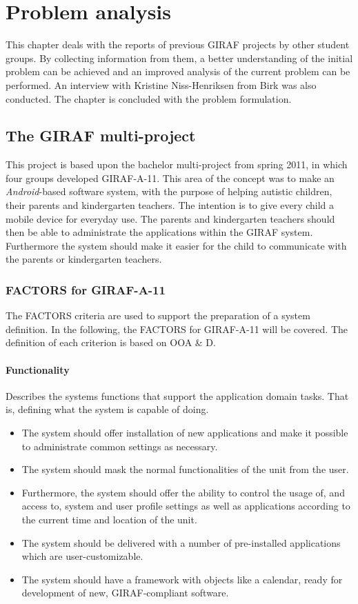 \chapter{Problem analysis}
This chapter deals with the reports of previous GIRAF projects by other student groups. By collecting information from them, a better understanding of the initial problem can be achieved and an improved analysis of the current problem can be performed. An interview with Kristine Niss-Henriksen from Birk was also conducted. The chapter is concluded with the problem formulation.

\section{The GIRAF multi-project}
This project is based upon the bachelor multi-project from spring 2011, in which four groups developed GIRAF-A-11. This area of the concept was to make an \emph{Android}-based software system, with the purpose of helping autistic children, their parents and kindergarten teachers. The intention is to give every child a mobile device for everyday use. The parents and kindergarten teachers should then be able to administrate the applications within the GIRAF system. Furthermore the system should make it easier for the child to communicate with the parents or kindergarten teachers. 

\subsection{FACTORS for GIRAF-A-11}
The FACTORS criteria are used to support the preparation of a system definition. In the following, the FACTORS for GIRAF-A-11 will be covered\cite{giraffactors}. The definition of each criterion is based on OOA \& D\cite{OOAD}.

\subsubsection{Functionality} 
Describes the systems functions that support the application domain tasks. That is, defining what the system is capable of doing.
\begin{itemize}
	\item The system should offer installation of new applications and make it possible to administrate common settings as necessary.
	\item The system should mask the normal functionalities of the unit from the user.
	\item Furthermore, the system should offer the ability to control the usage of, and access to, system and user profile settings as well as applications according to the current time and location of the unit.
	\item The system should be delivered with a number of pre-installed applications which are user-customizable.
	\item The system should have a framework with objects like a calendar, ready for development of new, GIRAF-compliant software.
\end{itemize}


